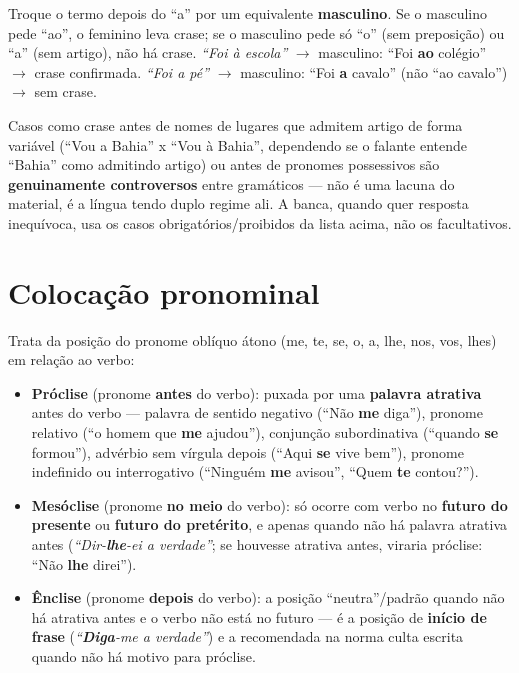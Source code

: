 \begin{regrapratica}
Troque o termo depois do “a” por um equivalente \textbf{masculino}. Se o
masculino pede “ao”, o feminino leva crase; se o masculino pede só “o” (sem
preposição) ou “a” (sem artigo), não há crase. \textit{“Foi à escola”}
$\to$ masculino: “Foi \textbf{ao} colégio” $\to$ crase confirmada.
\textit{“Foi a pé”} $\to$ masculino: “Foi \textbf{a} cavalo” (não “ao
cavalo”) $\to$ sem crase.
\end{regrapratica}

\begin{cuidado}
Casos como crase antes de nomes de lugares que admitem artigo de forma
variável (“Vou a Bahia” x “Vou à Bahia”, dependendo se o falante entende
“Bahia” como admitindo artigo) ou antes de pronomes possessivos são
\textbf{genuinamente controversos} entre gramáticos — não é uma lacuna do
material, é a língua tendo duplo regime ali. A banca, quando quer resposta
inequívoca, usa os casos obrigatórios/proibidos da lista acima, não os
facultativos.
\end{cuidado}

\section{Colocação pronominal}

\begin{conceito}
Trata da posição do pronome oblíquo átono (me, te, se, o, a, lhe, nos, vos,
lhes) em relação ao verbo:

\begin{itemize}
\item \textbf{Próclise} (pronome \textbf{antes} do verbo): puxada por uma
\textbf{palavra atrativa} antes do verbo --- palavra de sentido negativo
(“Não \textbf{me} diga”), pronome relativo (“o homem que \textbf{me}
ajudou”), conjunção subordinativa (“quando \textbf{se} formou”), advérbio
sem vírgula depois (“Aqui \textbf{se} vive bem”), pronome indefinido ou
interrogativo (“Ninguém \textbf{me} avisou”, “Quem \textbf{te} contou?”).
\item \textbf{Mesóclise} (pronome \textbf{no meio} do verbo): só ocorre com
verbo no \textbf{futuro do presente} ou \textbf{futuro do pretérito}, e
apenas quando não há palavra atrativa antes (\textit{“Dir-\textbf{lhe}-ei a
verdade”}; se houvesse atrativa antes, viraria próclise: “Não \textbf{lhe}
direi”).
\item \textbf{Ênclise} (pronome \textbf{depois} do verbo): a posição
“neutra”/padrão quando não há atrativa antes e o verbo não está no
futuro --- é a posição de \textbf{início de frase} (\textit{“\textbf{Diga}-me
a verdade”}) e a recomendada na norma culta escrita quando não há motivo
para próclise.
\end{itemize}
\end{conceito}

